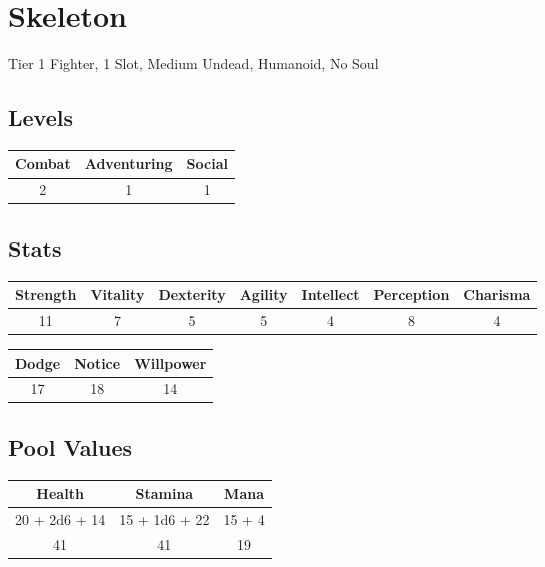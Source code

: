 \section{Skeleton}
Tier 1 Fighter, 1 Slot, Medium Undead, Humanoid, No Soul\\

\subsection{Levels}
\begin{minipage}[H]{1\textwidth}
    \centering
    \begin{tabular}[c]{|c | c | c|}
        \hline
        Combat & Adventuring & Social\\
        \hline
        2 & 1 & 1\\
        \hline
    \end{tabular}
\end{minipage}

\subsection{Stats}
\begin{minipage}[H]{1\textwidth}
    \centering
    \begin{tabular}[c]{|c | c | c | c | c | c | c|}
        \hline
        Strength & Vitality & Dexterity & Agility & Intellect & Perception & Charisma\\
        \hline
        11 & 7 & 5 & 5 & 4 & 8 & 4\\
        \hline
    \end{tabular}
\end{minipage}

\begin{minipage}[H]{1\textwidth}
    \centering
    \begin{tabular}[c]{|c | c | c|}
        \hline
        Dodge & Notice & Willpower\\
        \hline
        17 & 18 & 14\\
        \hline
    \end{tabular}
\end{minipage}

\subsection{Pool Values}
\begin{minipage}[H]{1\textwidth}
    \centering
    \begin{tabular}[c]{|c | c | c|}
        \hline
        Health & Stamina & Mana\\
        \hline
        20 + 2d6 + 14 & 15 + 1d6 + 22 & 15 + 4\\
        41 & 41 & 19\\
        \hline
    \end{tabular}
\end{minipage}



